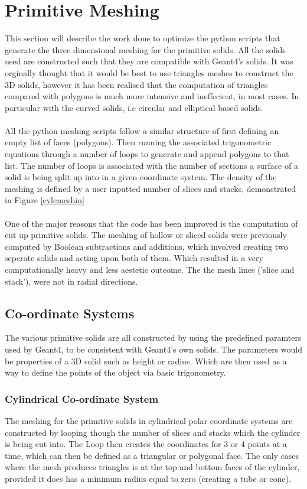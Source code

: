 \documentclass[12pt,a4paper]{article}
\begin{document}
\section{Primitive Meshing}
This section will describe the work done to optimize the python scripts that generate the three dimensional meshing for the primitive solids. All the solids used are constructed such that they are compatible with Geant4's solids. It was orginally thought that it would be best to use triangles meshes to construct the 3D solids, however it has been realised that the computation of triangles compared with polygons is much more intensive and ineffecient, in most cases. In particular with the curved solids, i.e circular and elliptical based solids.
\\\\
All the python meshing scripts follow a similar structure of first defining an empty list of faces (polygons). Then running the associated trigonometric equations through a number of loops to generate and append polygons to that list. The number of loops is associated with the number of sections a surface of a solid is being split up into in a given coordinate system. The density of the meshing is defined by a user inputted number of slices and stacks, demonstrated in Figure \ref{cylcmeshin}
\\\\
One of the major reasons that the code has been improved is the computation of cut up primitive solids. The meshing of hollow or sliced solids were previously computed by Boolean subtractions and additions, which involved creating two seperate solids and acting upon both of them. Which resulted in a very computationally heavy and less aestetic outcome. The the mesh lines ('slice and stack'), were not in radial directions.

\subsection{Co-ordinate Systems}
The various primitive solids are all constructed by using the predefined paramters used by Geant4, to be consistent with Geant4's own solids. The parameters would be properties of a 3D solid such as height or radius. Which are then used as a way to define the points of the object via basic trigonometry.\

\subsubsection{Cylindrical Co-ordinate System}
The meshing for the primitive solids in cylindrical polar coordinate systems are constructed by looping though the number of slices and stacks which the cylinder is being cut into. The Loop then creates the coordinates for 3 or 4 points at a time, which can then be defined as a triangular or polygonal face. The only cases where the mesh produces triangles is at the top and bottom faces of the cylinder, provided it does has a minimum radius equal to zero (creating a tube or cone). 
\end{document}
